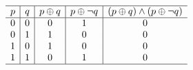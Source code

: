 {{\begin{practices}
\begin{enumerate}[A.]
{\begin{table}[H]
\[\begin{array}{c|c|c|c|c}
                                \hline
                                p & q & p \oplus q & p \oplus \neg q & (p \oplus q) \wedge (p \oplus \neg q) \\
                                \hline
                                0 & 0 & 0 & 1 & 0 \\
                                0 & 1 & 1 & 0 & 0 \\
                                1 & 0 & 1 & 0 & 0 \\
                                1 & 1 & 0 & 1 & 0 \\
                                \hline
                            \end{array}
                        \]
                    \end{table}
                }
            \end{enumerate}
        \end{practices}

}}
